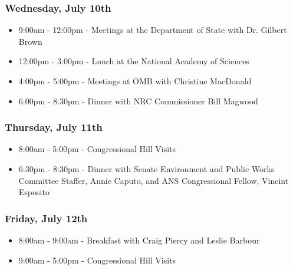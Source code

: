 \subsubsection*{Wednesday, July 10th}
\begin{itemize}
  \item 9:00am - 12:00pm - Meetings at the Department of State with Dr. Gilbert
    Brown
  \item 12:00pm - 3:00pm - Lunch at the National Academy of Sciences
  \item 4:00pm - 5:00pm - Meetings at OMB with Christine MacDonald
  \item 6:00pm - 8:30pm - Dinner with NRC Commissioner Bill Magwood
\end{itemize}

\subsubsection*{Thursday, July 11th}
\begin{itemize}
  \item 8:00am - 5:00pm - Congressional Hill Visits
  \item 6:30pm - 8:30pm - Dinner with Senate Environment and Public Works
    Committee Staffer, Annie Caputo, and ANS Congressional Fellow, Vincint
    Esposito
\end{itemize}

\subsubsection*{Friday, July 12th}
\begin{itemize}
  \item 8:00am - 9:00am - Breakfast with Craig Piercy and Leslie Barbour
  \item 9:00am - 5:00pm - Congressional Hill Visits
\end{itemize}
